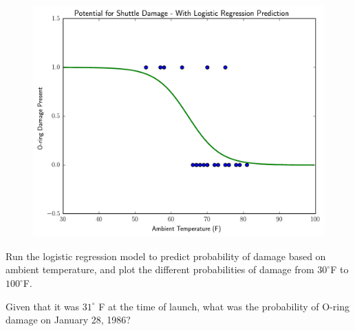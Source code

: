 \begin{figure}
\label{logisticmodel}
\includegraphics[width=\textwidth]{logreg.pdf}
\end{figure}


\begin{problem}
Run the logistic regression model to predict probability of damage based on ambient temperature, and plot the different probabilities of damage from $30^{\circ} $F to $100^{\circ} $F. 
\end{problem}

\begin{problem}
Given that it was $31^{\circ}$ F at the time of launch, what was the probability of O-ring damage on January 28, 1986?
\end{problem}

